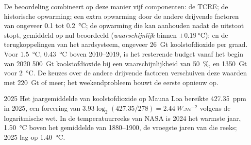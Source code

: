 De beoordeling combineert op deze manier vijf componenten: de TCRE; de historische opwarming; een
extra opwarming door de andere drijvende factoren van ongeveer 0.1 tot \qty{0.2}{\celsius}; de opwarming die kan
aanhouden nadat de uitstoot stopt, gemiddeld op nul beoordeeld (\emph{waarschijnlijk} binnen $\pm
\qty{0.19}{\celsius}$); en de terugkoppelingen van het aardsysteem, ongeveer \qty{26}{Gt} koolstofdioxide per
graad. Voor \qty{1.5}{\celsius}, \qty{0.43}{\celsius} boven 2010--2019, is het resterende budget vanaf het
begin van 2020 \qty{500}{Gt} koolstofdioxide bij een waarschijnlijkheid van \qty{50}{\percent}, en
\qty{1350}{Gt} voor \qty{2}{\celsius}. De keuzes over de andere drijvende factoren verschuiven deze waarden met
\qty{220}{Gt} of meer; het weekendprobleem bouwt de eerste opnieuw op.

\begin{dated}{2025}
Het jaargemiddelde van koolstofdioxide op Mauna Loa bereikte \qty{427.35}{ppm} in 2025, een forcering van
$3.93\log_2(427.35/278) = \qty{2.44}{W.m^{-2}}$ volgens de logaritmische wet. In de temperatuurreeks van NASA
is 2024 het warmste jaar, \qty{1.50}{\celsius} boven het gemiddelde van 1880--1900, de vroegste
jaren van die reeks; 2025 lag op \qty{1.40}{\celsius}.
\end{dated}

